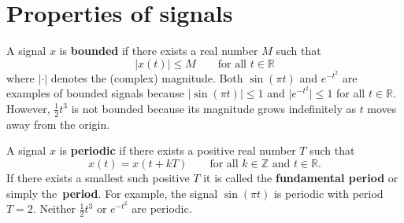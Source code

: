 \documentclass[11pt,a4paper]{book}
\theoremstyle{plain}
\numberwithin{equation}{section}
\newcommand{\reals}{{\mathbb R}}
\newcommand{\ints}{{\mathbb Z}}
\newcommand{\term}{\textbf}
\newcommand{\sabs}[1]{\vert #1 \vert}
\begin{document}

\section{Properties of signals}\label{sec:properties-signals}

A signal $x$ is \term{bounded} if there exists a real number $M$ such that 
\[
\sabs{x(t)} \leq M \qquad \text{for all $t \in \reals$} 
\]
where $\sabs{\cdot}$ denotes the (complex) magnitude.  Both $\sin( \pi t)$ and $e^{-t^2}$ are examples of bounded signals because $\sabs{\sin( \pi t)} \leq 1$ and $\sabs{e^{-t^2}} \leq 1$ for all $t \in \reals$.  However, $\frac{1}{2}t^3$ is not bounded because its magnitude grows indefinitely as $t$ moves away from the origin.  %

A signal $x$ is \term{periodic} if there exists a positive real number $T$ such that
\[
x(t) = x(t + kT) \qquad \text{for all $k \in \ints$ and $t \in \reals$.}
\]
If there exists a smallest such positive $T$ it is called the \term{fundamental period} or simply the~\term{period}.  For example, the signal $\sin( \pi t)$ is periodic with period $T=2$.  Neither $\frac{1}{2}t^3$ or $e^{-t^2}$ are periodic.  %
\end{document}
